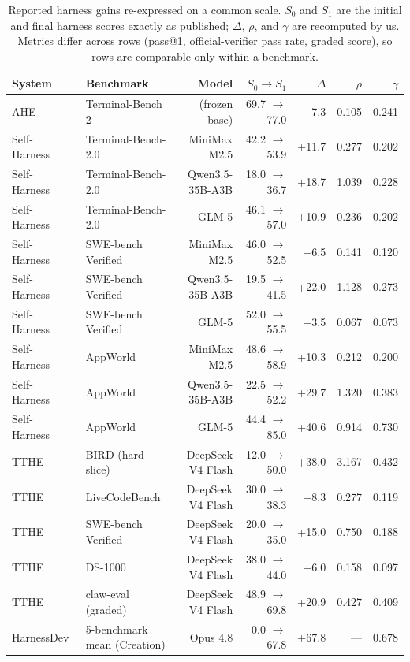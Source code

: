 \documentclass[conference]{IEEEtran}
\begin{document}
\begin{table}[t]
\caption{Reported harness gains re-expressed on a common scale. $S_0$ and $S_1$ are the initial and final harness scores exactly as published; $\Delta$, $\rho$, and $\gamma$ are recomputed by us. Metrics differ across rows (pass@1, official-verifier pass rate, graded score), so rows are comparable only within a benchmark.}
\label{tab:gains}
\centering
\footnotesize
\begin{tabular}{@{}llrrrrr@{}}
\toprule
\textbf{System} & \textbf{Benchmark} & \textbf{Model} & \textbf{$S_0 \to S_1$} & \textbf{$\Delta$} & \textbf{$\rho$} & \textbf{$\gamma$} \\
\midrule
AHE~\cite{b3}            & Terminal-Bench 2      & (frozen base)          & 69.7 $\to$ 77.0 & +7.3  & 0.105 & 0.241 \\
Self-Harness~\cite{b4}   & Terminal-Bench-2.0    & MiniMax M2.5           & 42.2 $\to$ 53.9 & +11.7 & 0.277 & 0.202 \\
Self-Harness~\cite{b4}   & Terminal-Bench-2.0    & Qwen3.5-35B-A3B        & 18.0 $\to$ 36.7 & +18.7 & 1.039 & 0.228 \\
Self-Harness~\cite{b4}   & Terminal-Bench-2.0    & GLM-5                  & 46.1 $\to$ 57.0 & +10.9 & 0.236 & 0.202 \\
Self-Harness~\cite{b4}   & SWE-bench Verified    & MiniMax M2.5           & 46.0 $\to$ 52.5 & +6.5  & 0.141 & 0.120 \\
Self-Harness~\cite{b4}   & SWE-bench Verified    & Qwen3.5-35B-A3B        & 19.5 $\to$ 41.5 & +22.0 & 1.128 & 0.273 \\
Self-Harness~\cite{b4}   & SWE-bench Verified    & GLM-5                  & 52.0 $\to$ 55.5 & +3.5  & 0.067 & 0.073 \\
Self-Harness~\cite{b4}   & AppWorld              & MiniMax M2.5           & 48.6 $\to$ 58.9 & +10.3 & 0.212 & 0.200 \\
Self-Harness~\cite{b4}   & AppWorld              & Qwen3.5-35B-A3B        & 22.5 $\to$ 52.2 & +29.7 & 1.320 & 0.383 \\
Self-Harness~\cite{b4}   & AppWorld              & GLM-5                  & 44.4 $\to$ 85.0 & +40.6 & 0.914 & 0.730 \\
TTHE~\cite{b5}           & BIRD (hard slice)     & DeepSeek V4 Flash      & 12.0 $\to$ 50.0 & +38.0 & 3.167 & 0.432 \\
TTHE~\cite{b5}           & LiveCodeBench         & DeepSeek V4 Flash      & 30.0 $\to$ 38.3 & +8.3  & 0.277 & 0.119 \\
TTHE~\cite{b5}           & SWE-bench Verified    & DeepSeek V4 Flash      & 20.0 $\to$ 35.0 & +15.0 & 0.750 & 0.188 \\
TTHE~\cite{b5}           & DS-1000               & DeepSeek V4 Flash      & 38.0 $\to$ 44.0 & +6.0  & 0.158 & 0.097 \\
TTHE~\cite{b5}           & claw-eval (graded)    & DeepSeek V4 Flash      & 48.9 $\to$ 69.8 & +20.9 & 0.427 & 0.409 \\
HarnessDev~\cite{b6}     & 5-benchmark mean (Creation) & Opus 4.8         & 0.0 $\to$ 67.8  & +67.8 & ---   & 0.678 \\
\bottomrule
\end{tabular}
\end{table}
\end{document}
